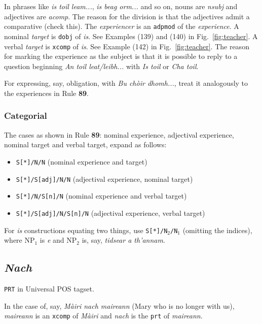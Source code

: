 \documentclass[a4paper]{article}
\begin{document}
 In phrases like \textit{is toil leam...}, \textit{is beag orm...} and so on, nouns are \textit{nsubj} and adjectives are \textit{acomp}. The reason for the division is that the adjectives admit a comparative (check this).
The \textit{experiencer} is an \texttt{adpmod} of the \textit{experience}.
A nominal \textit{target} is \texttt{dobj} of \textit{is}. See Examples (139) and (140) in Fig.~\ref{fig:teacher}.
A verbal \textit{target} is \texttt{xcomp} of \textit{is}. See Example (142) in Fig.~\ref{fig:teacher}.
The reason for marking the experience as the subject is that it is possible to reply to a question beginning \textit{An toil leat/leibh...} with \textit{Is toil} or \textit{Cha toil}.

 For expressing, say, obligation, with \textit{Bu ch\`oir dhomh...}, treat it analogously to the experiences in Rule \textbf{89}.


\subsubsection*{Categorial}
The cases as shown in Rule \textbf{89}: nominal experience, adjectival experience, nominal target and verbal target, expand as follows:
\begin{itemize}
\item \texttt{S[*]/N/N} (nominal experience and target)
\item \texttt{S[*]/S[adj]/N/N} (adjectival experience, nominal target)
\item \texttt{S[*]/N/S[n]/N} (nominal experience and verbal target)
\item \texttt{S[*]/S[adj]/N/S[n]/N} (adjectival experience, verbal target)
\end{itemize}

 For \textit{is} constructions equating two things, use \texttt{S[*]/N$_2$/N$_1$} (omitting the indices), where NP$_1$ is \textit{e} and NP$_2$ is, say, \textit{tidsear a th'annam}. 

\subsection{\textit{Nach}\label{subsect:nach}}

\texttt{PRT} in Universal POS tagset.

 In the case of, say, \textit{M\`airi nach maireann} (Mary who is no longer with us), \textit{maireann} is an \texttt{xcomp} of \textit{M\`airi} and \textit{nach} is the \texttt{prt} of \textit{maireann}.
\end{document}
